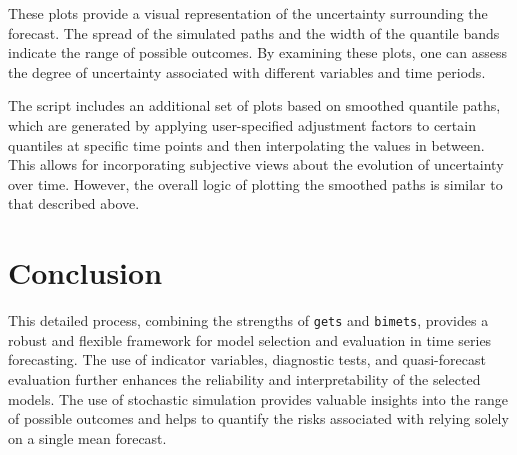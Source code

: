 \documentclass[
  letterpaper,
  DIV=11,
  numbers=noendperiod]{scrreport}
\begin{document}
These plots provide a visual representation of the uncertainty
surrounding the forecast. The spread of the simulated paths and the
width of the quantile bands indicate the range of possible outcomes. By
examining these plots, one can assess the degree of uncertainty
associated with different variables and time periods.

The script includes an additional set of plots based on smoothed
quantile paths, which are generated by applying user-specified
adjustment factors to certain quantiles at specific time points and then
interpolating the values in between. This allows for incorporating
subjective views about the evolution of uncertainty over time. However,
the overall logic of plotting the smoothed paths is similar to that
described above.

\section{Conclusion}\label{conclusion}

This detailed process, combining the strengths of \texttt{gets} and
\texttt{bimets}, provides a robust and flexible framework for model
selection and evaluation in time series forecasting. The use of
indicator variables, diagnostic tests, and quasi-forecast evaluation
further enhances the reliability and interpretability of the selected
models. The use of stochastic simulation provides valuable insights into
the range of possible outcomes and helps to quantify the risks
associated with relying solely on a single mean forecast.
\end{document}
